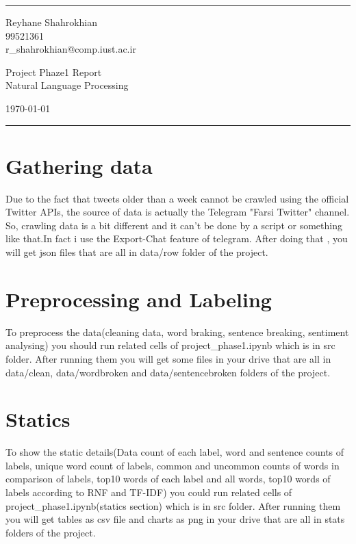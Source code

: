 \documentclass[a4paper]{article}
\begin{document}

\fancyhead[C]{}
\hrule \medskip %
\begin{minipage}{0.295\textwidth} 
\raggedright
\footnotesize
Reyhane Shahrokhian \hfill\\   
99521361\hfill\\
r\_shahrokhian@comp.iust.ac.ir
\end{minipage}
\begin{minipage}{0.4\textwidth} 
\centering 
\large 
Project Phaze1 Report\\ 
\normalsize 
Natural Language Processing\\ 
\end{minipage}
\begin{minipage}{0.295\textwidth} 
\raggedleft
\today\hfill\\
\end{minipage}
\medskip\hrule 
\bigskip



\section{Gathering data}
Due to the fact that tweets older than a week cannot be crawled using the official Twitter APIs, the source of data is actually the Telegram "Farsi Twitter" channel. So, crawling data is a bit different and it can't be done by a script or something like that.In fact i use the Export-Chat feature of telegram.
After doing that , you will get json files that are all in data/row folder of  the project.\\
\section{Preprocessing and Labeling}
To preprocess the data(cleaning data, word braking, sentence breaking, sentiment analysing) you should run related cells of project\_phase1.ipynb which is in src folder. After running them you will get some files in your drive that are all in data/clean, data/wordbroken and data/sentencebroken folders of the project.\\
\section{Statics}
To show the static details(Data count of each label, word and sentence counts of labels, unique word count of labels, common and uncommon counts of words in comparison of labels, top10 words of each label and all words, top10 words of labels according to RNF and TF-IDF) you could run related cells of project\_phase1.ipynb(statics section) which is in src folder. After running them you will get tables as csv file and charts as png in your drive that are all in stats folders of the project.\\
\end{document}
